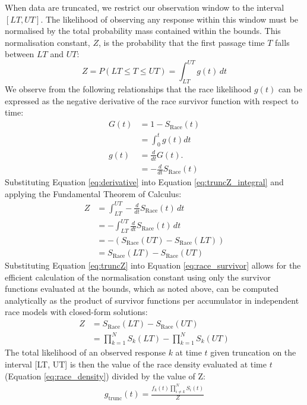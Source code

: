 \documentclass[12pt,a4paper,one side]{article}
\begin{document}
When data are truncated, we restrict our observation window to the interval $[LT, UT]$. The likelihood of observing any response within this window must be normalised by the total probability mass contained within the bounds. This normalisation constant, $Z$, is the probability that the first passage time $T$ falls between $LT$ and $UT$:
\begin{equation}
    Z = P(LT \leq T \leq UT) = \int_{LT}^{UT} g(t) \, dt
    \label{eq:truncZ_integral}
\end{equation}
We observe from the following relationships that the race likelihood $g(t)$ can be expressed as the negative derivative of the race survivor function with respect to time:
\begin{subequations}
    \begin{align}
        G(t) &= 1 - S_{\text{Race}}(t) \label{eq:cdf} \\
        &= \int_{0}^{t} g(t) dt \nonumber \\
        g(t) &= \frac{d}{dt} G(t). \nonumber \\
        &= - \frac{d}{dt} S_{\text{Race}}(t) \label{eq:derivative}
    \end{align}
\end{subequations}
Substituting Equation \ref{eq:derivative} into Equation \ref{eq:truncZ_integral} and applying the Fundamental Theorem of Calculus:
\begin{align}
    Z &= \int_{LT}^{UT} - \frac{d}{dt} S_{\text{Race}}(t) \, dt \nonumber \\
    &= - \int_{LT}^{UT} \frac{d}{dt} S_{\text{Race}}(t) \, dt \nonumber \\
    &= - (S_{\text{Race}}(UT) - S_{\text{Race}}(LT)) \nonumber \\
    &= S_{\text{Race}}(LT) - S_{\text{Race}}(UT)
    \label{eq:truncZ}
\end{align}
Substituting Equation \ref{eq:truncZ} into Equation \ref{eq:race_survivor} allows for the efficient calculation of the normalisation constant using only the survivor functions evaluated at the bounds, which as noted above, can be computed analytically as the product of survivor functions per accumulator in independent race models with closed-form solutions: 
\begin{align}
    Z &= S_{\text{Race}}(LT) - S_{\text{Race}}(UT) \nonumber \\
    & = \prod_{k=1}^{N} S_k(LT) - \prod_{k=1}^{N} S_k(UT)
    \label{eq:truncZ_identity}
\end{align}
The total likelihood of an observed response $k$ at time $t$ given truncation on the interval [LT, UT] is then the value of the race density evaluated at time $t$ (Equation \ref{eq:race_density}) divided by the value of Z:
\begin{align}
    g_{\text{trunc}}(t) = \frac{f_k(t)\prod_{i\neq k}^{N} S_i(t)}{Z}
    \label{eq:race_density_truncated}
\end{align}
\end{document}
